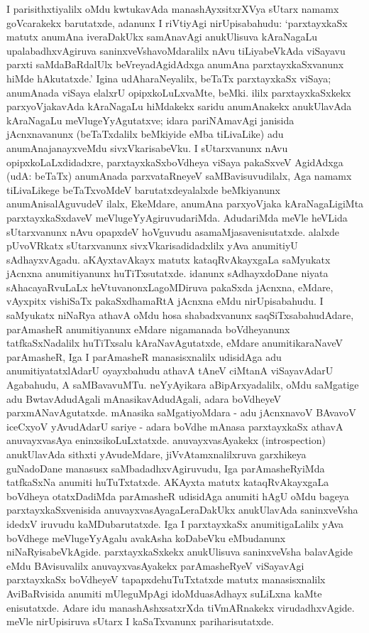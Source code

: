 I parisithxtiyalilx oMdu kwtukavAda manashAyxsitxrXVya sUtarx namamx goVcarakekx baru\-tatxde, adanunx I riVtiyAgi nirUpisabahudu: `parxtayxkaSx matutx anumAna iveraDakUkx samAnavAgi anukUlisuva kAraNagaLu upalabadhxvAgiruva saninxveVshavoMdaralilx nAvu tiLiyabeVkAda viSayavu parxti saMdaBaRdalUlx beVreyadAgidAdxga anumAna parxtayxkaSx\-vanunx hiMde hAkutatxde.' Igina udAharaNeyalilx, beTaTx parxtayxkaSx viSaya; anumAnada viSaya elalxrU opipxkoLuLxvaMte, beMki. ililx parxtayxkaSxkekx parxyoVjakavAda kAraNagaLu hiMdakekx saridu anumAnakekx anukUlavAda kAraNagaLu meVlugeYyAgutatxve; idara pariNAmavAgi janisida jAcnxnavanunx (beTaTxdalilx beMkiyide eMba tiLivaLike) adu anu\-mAna\-janayxveMdu sivxVkarisabeVku. I sUtarxvanunx nAvu opipxkoLaLxdidadxre, parxtayxkaSx\break boVdheya viSaya pakaSxveV AgidAdxga (udA: beTaTx) anumAnada parxvataRneyeV saMBavi\-suvudilalx, Aga namamx tiLivaLikege beTaTxvoMdeV barutatxdeyalalxde beMkiyanunx anu\-mAnisa\-lAguvudeV ilalx, EkeMdare, anumAna parxyoVjaka kAraNagaLigiMta parxtayxkaSxdaveV meVlu\-geYyAgiruvudariMda. AdudariMda meVle heVLida sUtarxvanunx nAvu opapxdeV hoVgu\-vudu asamaMjasavenisutatxde. alalxde pUvoVRkatx sUtarxvanunx sivxVkarisadidadxlilx yAva anumitiyU sAdhayxvAgadu. aKAyxtavAkayx matutx kataqRvAkayxgaLa saMyukatx \hbox{jAcnxna} anu\-mitiyanunx huTiTxsutatxde. idanunx sAdhayxdoDane niyata sAhacayaRvuLaLx heVtu\-vanonxLa\-goMDiruva pakaSxda jAcnxna, eMdare, vAyxpitx vishiSaTx pakaSxdhamaRtA jAcnxna eMdu nirUpisa\-bahudu. I saMyukatx niNaRya athavA oMdu hosa shabadxvanunx saqSiTxsabahudAdare, parAmasheR anumitiyanunx eMdare nigamanada boVdheyanunx tatfkaSxNadalilx huTiTxsalu kAraNavAgutatxde, eMdare anumitikaraNaveV parAmasheR, Iga I parAmasheR manasisx\-nalilx udisidAga adu anumitiyatatxlAdarU oyayxbahudu athavA tAneV \hbox{ciMtanA} viSayavAdarU Agabahudu, A saMBavavuMTu. neYyAyikara aBipArxya\-dalilx, oMdu saMgatige adu BwtavAdudAgali mAnasikavAdudAgali, adara boVdheyeV parxmANa\-vAgutatxde. mAnasika saMgatiyoMdara - adu jAcnxnavoV BAvavoV iceCxyoV yAvudAdarU sariye - adara boVdhe mAnasa parxtayxkaSx athavA anuvayxvasAya eninxsi\-koLuLxtatxde. anuvayxvasAyakekx {\rm(introspection)} anukUlavAda sithxti yAvu\-deMdare, jiVvAtamxnalilxruva garxhikeya guNadoDane manasusx saMbadadhxvAgiruvudu, Iga parA\-masheR\-yiMda tatfkaSxNa anumiti huTuTxtatxde. AKAyxta matutx kataqRvAkayxgaLa boVdheya otatxDa\-diMda parAmasheR udisidAga anumiti hAgU oMdu bageya parxtayxkaSxvenisida anu\-vayxvasAyagaLeraDakUkx anukUlavAda saninxveVsha idedxV iruvudu kaMDubarutatxde. Iga I parxtayxkaSx anumitigaLalilx yAva boVdhege meVlugeYyAgalu avakAsha koDabeVku eMbudanunx niNaRyisabeVkAgide. parxtayxkaSxkekx anukUlisuva saninxveVsha balavAgide eMdu BAvisuvalilx anuvayxvasAyakekx parAmasheRyeV viSayavAgi parxtayxkaSx boVdheyeV \hbox{tapapxde}\break huTuTxtatxde matutx manasisxnalilx AviBaRvisida anumiti mUleguMpAgi idoMdu\break \hbox{asAdhayx} suLiLxna kaMte enisutatxde. Adare idu manashAshxsatxrXda tiVmARnakekx virudadhxvAgide. meVle nirUpisiruva sUtarx I kaSaTxvanunx pariharisutatxde.

